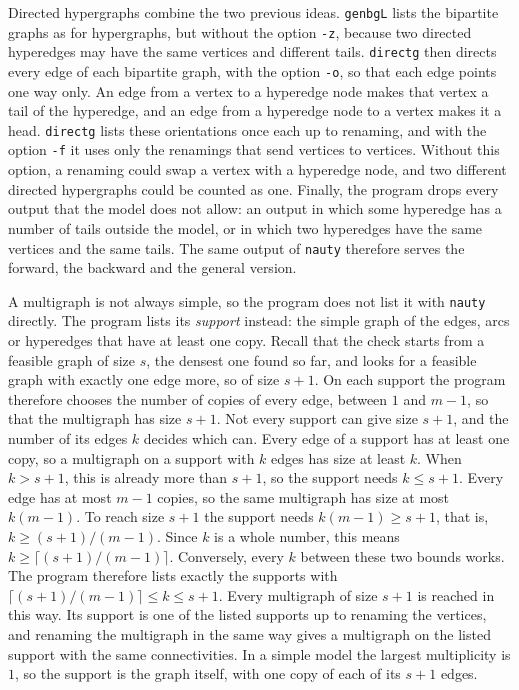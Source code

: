 Directed hypergraphs combine the two previous ideas.
\texttt{genbgL} lists the bipartite graphs as for hypergraphs, but without the option \texttt{-z}, because two directed hyperedges may have the same vertices and different tails.
\texttt{directg} then directs every edge of each bipartite graph, with the option \texttt{-o}, so that each edge points one way only.
An edge from a vertex to a hyperedge node makes that vertex a tail of the hyperedge, and an edge from a hyperedge node to a vertex makes it a head.
\texttt{directg} lists these orientations once each up to renaming, and with the option \texttt{-f} it uses only the renamings that send vertices to vertices.
Without this option, a renaming could swap a vertex with a hyperedge node, and two different directed hypergraphs could be counted as one.
Finally, the program drops every output that the model does not allow: an output in which some hyperedge has a number of tails outside the model, or in which two hyperedges have the same vertices and the same tails.
The same output of \texttt{nauty} therefore serves the forward, the backward and the general version.

A multigraph is not always simple, so the program does not list it with \texttt{nauty} directly.
The program lists its \emph{support} instead: the simple graph of the edges, arcs or hyperedges that have at least one copy.
Recall that the check starts from a feasible graph of size $s$, the densest one found so far, and looks for a feasible graph with exactly one edge more, so of size $s+1$.
On each support the program therefore chooses the number of copies of every edge, between $1$ and $m-1$, so that the multigraph has size $s+1$.
Not every support can give size $s+1$, and the number of its edges $k$ decides which can.
Every edge of a support has at least one copy, so a multigraph on a support with $k$ edges has size at least $k$. When $k>s+1$, this is already more than $s+1$, so the support needs $k\le s+1$.
Every edge has at most $m-1$ copies, so the same multigraph has size at most $k(m-1)$. To reach size $s+1$ the support needs $k(m-1)\ge s+1$, that is, $k\ge (s+1)/(m-1)$. Since $k$ is a whole number, this means $k\ge\lceil (s+1)/(m-1)\rceil$.
Conversely, every $k$ between these two bounds works.
The program therefore lists exactly the supports with $\lceil (s+1)/(m-1)\rceil\le k\le s+1$.
Every multigraph of size $s+1$ is reached in this way. Its support is one of the listed supports up to renaming the vertices, and renaming the multigraph in the same way gives a multigraph on the listed support with the same connectivities.
In a simple model the largest multiplicity is $1$, so the support is the graph itself, with one copy of each of its $s+1$ edges.

